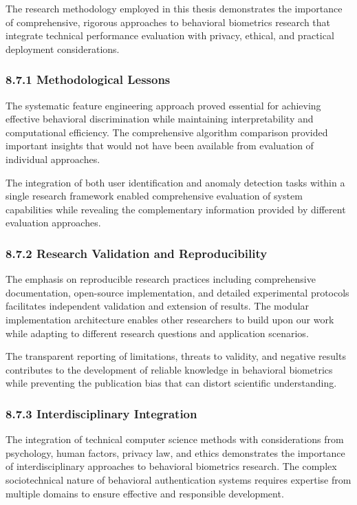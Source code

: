 \documentclass[
  11pt,
  a4paper,
]{article}
\begin{document}
The research methodology employed in this thesis demonstrates the
importance of comprehensive, rigorous approaches to behavioral
biometrics research that integrate technical performance evaluation with
privacy, ethical, and practical deployment considerations.

\subsubsection{8.7.1 Methodological
Lessons}\label{methodological-lessons}

The systematic feature engineering approach proved essential for
achieving effective behavioral discrimination while maintaining
interpretability and computational efficiency. The comprehensive
algorithm comparison provided important insights that would not have
been available from evaluation of individual approaches.

The integration of both user identification and anomaly detection tasks
within a single research framework enabled comprehensive evaluation of
system capabilities while revealing the complementary information
provided by different evaluation approaches.

\subsubsection{8.7.2 Research Validation and
Reproducibility}\label{research-validation-and-reproducibility}

The emphasis on reproducible research practices including comprehensive
documentation, open-source implementation, and detailed experimental
protocols facilitates independent validation and extension of results.
The modular implementation architecture enables other researchers to
build upon our work while adapting to different research questions and
application scenarios.

The transparent reporting of limitations, threats to validity, and
negative results contributes to the development of reliable knowledge in
behavioral biometrics while preventing the publication bias that can
distort scientific understanding.

\subsubsection{8.7.3 Interdisciplinary
Integration}\label{interdisciplinary-integration}

The integration of technical computer science methods with
considerations from psychology, human factors, privacy law, and ethics
demonstrates the importance of interdisciplinary approaches to
behavioral biometrics research. The complex sociotechnical nature of
behavioral authentication systems requires expertise from multiple
domains to ensure effective and responsible development.
\end{document}
